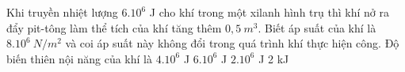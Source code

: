 \begin{vidu}%
	Khi truyền nhiệt lượng $6. 10^6$ J cho khí trong một xilanh hình trụ thì khí nở ra đẩy pit-tông làm thể tích của khí tăng thêm $0,5\ m^3$. Biết áp suất của khí là $8. 10^6\ N/m^2$ và coi áp suất này không đổi trong quá trình khí thực hiện công. Độ biến thiên nội năng của khí là
	\choice
	{$4. 10^6$ J}
	{$6. 10^6$ J}
	{\True $2. 10^6$ J}
	{2 kJ}
\end{vidu}
